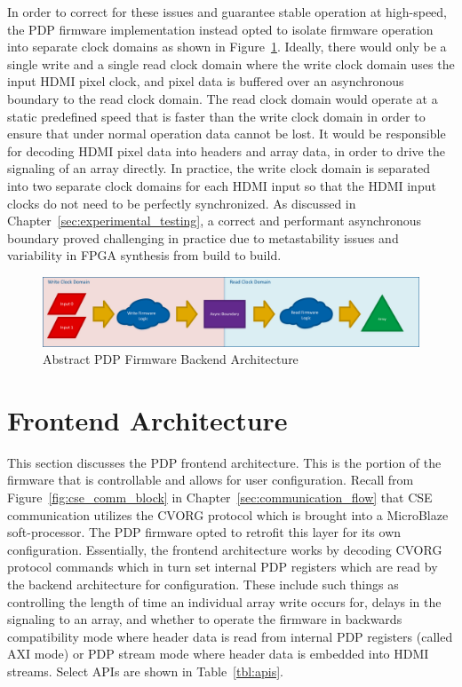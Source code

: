     In order to correct for these issues and guarantee stable operation at high-speed, the PDP firmware implementation instead opted to isolate firmware operation into separate clock domains as shown in Figure~\ref{fig:abstract_architecture}. Ideally, there would only be a single write and a single read clock domain where the write clock domain uses the input HDMI pixel clock, and pixel data is buffered over an asynchronous boundary to the read clock domain. The read clock domain would operate at a static predefined speed that is faster than the write clock domain in order to ensure that under normal operation data cannot be lost. It would be responsible for decoding HDMI pixel data into headers and array data, in order to drive the signaling of an array directly. In practice, the write clock domain is separated into two separate clock domains for each HDMI input so that the HDMI input clocks do not need to be perfectly synchronized. As discussed in Chapter~\ref{sec:experimental_testing}, a correct and performant asynchronous boundary proved challenging in practice due to metastability issues and variability in FPGA synthesis from build to build.

    \begin{figure}
        \centering
        \includegraphics[width=1.0\textwidth]{fig/abstract_architecture.pdf}
        \caption{Abstract PDP Firmware Backend Architecture}
        \label{fig:abstract_architecture}
    \end{figure}

\section{Frontend Architecture}
    \label{sec:frontend_arch}
    This section discusses the PDP frontend architecture. This is the portion of the firmware that is controllable and allows for user configuration. Recall from Figure~\ref{fig:cse_comm_block} in Chapter~\ref{sec:communication_flow} that CSE communication utilizes the CVORG protocol which is brought into a MicroBlaze soft-processor. The PDP firmware opted to retrofit this layer for its own configuration. Essentially, the frontend architecture works by decoding CVORG protocol commands which in turn set internal PDP registers which are read by the backend architecture for configuration. These include such things as controlling the length of time an individual array write occurs for, delays in the signaling to an array, and whether to operate the firmware in backwards compatibility mode where header data is read from internal PDP registers (called AXI mode) or PDP stream mode where header data is embedded into HDMI streams. Select APIs are shown in Table~\ref{tbl:apis}.

